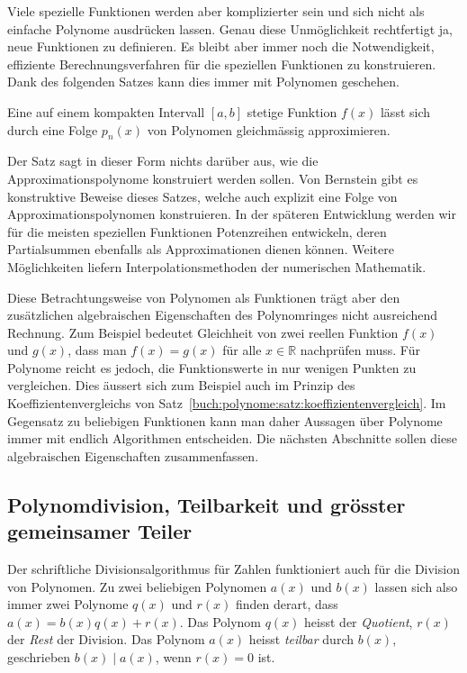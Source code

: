 Viele spezielle Funktionen werden aber komplizierter sein und
sich nicht als einfache Polynome ausdrücken lassen.
Genau diese Unmöglichkeit rechtfertigt ja, neue Funktionen
zu definieren.
Es bleibt aber immer noch die Notwendigkeit, effiziente 
Berechnungsverfahren für die speziellen Funktionen zu konstruieren.
Dank des folgenden Satzes kann dies immer mit Polynomen geschehen.

\begin{satz}[Weierstrass]
%
%
\label{buch:potenzen:satz:weierstrass}
%
Eine auf einem kompakten Intervall $[a,b]$ stetige Funktion $f(x)$
lässt sich durch eine Folge $p_n(x)$ von Polynomen gleichmässig
approximieren.
\end{satz}

Der Satz sagt in dieser Form nichts darüber aus, wie die
Approximationspolynome konstruiert werden sollen.
%
Von Bernstein gibt es konstruktive Beweise dieses Satzes,
%
welche auch explizit eine Folge von Approximationspolynomen
konstruieren.
In der späteren Entwicklung werden wir für die meisten
speziellen Funktionen Potenzreihen entwickeln, deren Partialsummen
ebenfalls als Approximationen dienen können.
Weitere Möglichkeiten liefern Interpolationsmethoden der
numerischen Mathematik.

Diese Betrachtungsweise von Polynomen als Funktionen trägt
aber den zusätzlichen algebraischen Eigenschaften des Polynomringes
nicht ausreichend Rechnung.
Zum Beispiel bedeutet Gleichheit von zwei reellen Funktion $f(x)$ und
$g(x)$, dass man $f(x)=g(x)$ für alle $x\in\mathbb{R}$ nachprüfen
muss.
Für Polynome reicht es jedoch, die Funktionswerte in nur wenigen
Punkten zu vergleichen.
Dies äussert sich zum Beispiel auch im Prinzip des
Koeffizientenvergleichs von
Satz~\ref{buch:polynome:satz:koeffizientenvergleich}.
Im Gegensatz zu beliebigen Funktionen kann man daher Aussagen
über Polynome immer mit endlich Algorithmen entscheiden.
Die nächsten Abschnitte sollen diese algebraischen Eigenschaften
zusammenfassen.

%
%
\subsection{Polynomdivision, Teilbarkeit und grösster gemeinsamer Teiler}
Der schriftliche Divisionsalgorithmus für Zahlen funktioniert 
auch für die Division von Polynomen.
%
Zu zwei beliebigen Polynomen $a(x)$ und $b(x)$ lassen sich also
immer zwei Polynome $q(x)$ und $r(x)$ finden derart, dass
$a(x) = b(x) q(x) + r(x)$.
Das Polynom $q(x)$ heisst der {\em Quotient}, $r(x)$ der {\em Rest}
der Division.
Das Polynom $a(x)$ heisst {\em teilbar} durch $b(x)$, geschrieben
%
%
$b(x)\mid a(x)$, wenn $r(x)=0$ ist.

